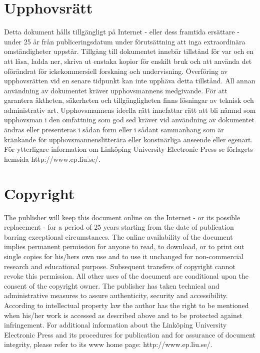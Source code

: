 \section*{Upphovsrätt}
Detta dokument hålls tillgängligt på Internet - eller dess framtida ersättare - under 25 år från publiceringsdatum under förutsättning att inga extraordinära omständigheter uppstår. Tillgång till dokumentet innebär tillstånd för var och en att läsa, ladda ner, skriva ut enstaka kopior för enskilt bruk och att använda det oförändrat för ickekommersiell forskning och undervisning. Överföring av upphovsrätten vid en senare tidpunkt kan inte upphäva detta tillstånd. All annan användning av dokumentet kräver upphovsmannens medgivande. För att garantera äktheten, säkerheten och tillgängligheten finns lösningar av teknisk och administrativ art. Upphovsmannens ideella rätt innefattar rätt att bli nämnd som upphovsman i den omfattning som god sed kräver vid användning av dokumentet ändras eller presenteras i sådan form eller i sådant sammanhang som är kränkande för upphovsmannenslitterära eller konstnärliga anseende eller egenart. För ytterligare information om Linköping University Electronic Press se förlagets hemsida http://www.ep.liu.se/.

\section*{Copyright}
The publisher will keep this document online on the Internet - or its possible replacement - for a period of 25 years starting from the date of publication barring exceptional circumstances. The online availability of the document implies permanent permission for anyone to read, to download, or to print out single copies for his/hers own use and to use it unchanged for non-commercial research and educational purpose. Subsequent transfers of copyright cannot revoke this permission. All other uses of the document are conditional upon the consent of the copyright owner. The publisher has taken technical and administrative measures to assure authenticity, security and accessibility. According to intellectual property law the author has the right to be mentioned when his/her work is accessed as described above and to be protected against infringement. For additional information about the Linköping University Electronic Press and its procedures for publication and for assurance of document integrity, please refer to its www home page: http://www.ep.liu.se/.

\vspace{2cm}
\setlength{\parindent}{2cm} 
\setlength{\parindent}{0cm}
\clearpage
